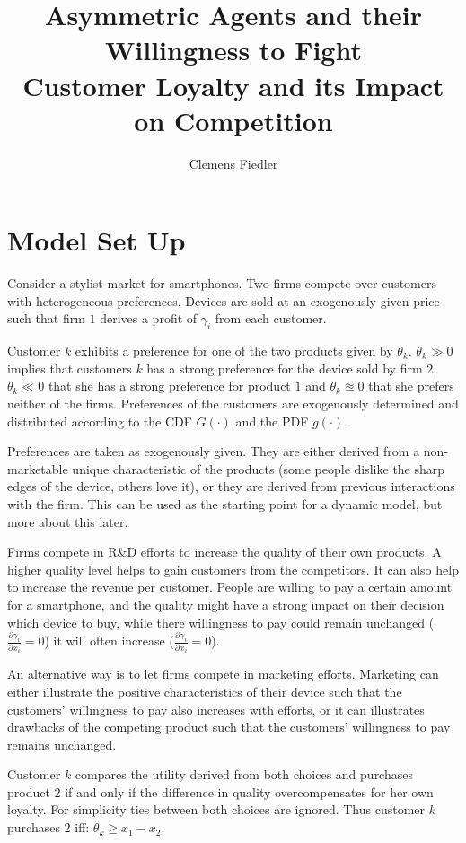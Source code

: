 \documentclass[a4paper, 11pt]{article}
\author{Clemens Fiedler}
\title{Asymmetric Agents and their Willingness to Fight\\
	Customer Loyalty and its Impact on Competition}
\begin{document}
	
\maketitle

\section{Model Set Up}
Consider a stylist market for smartphones. Two firms compete over customers with heterogeneous preferences. Devices are sold at an exogenously given price such that firm $1$ derives a profit of $\gamma_i$ from each customer.

Customer $k$ exhibits a preference for one of the two products given by $\theta_k$. $\theta_k\gg0$ implies that customers $k$ has a strong preference for the device sold by firm $2$, $\theta_k\ll0$ that she has a strong preference for product $1$ and $\theta_k\approxeq 0$ that she prefers neither of the firms. Preferences of the customers are exogenously determined and distributed according to the CDF $G(\cdot)$ and the PDF $g(\cdot)$.

Preferences are taken as exogenously given. They are either derived from a non-marketable unique characteristic of the products (some people dislike the sharp edges of the device, others love it), or they are derived from previous interactions with the firm. This can be used as the starting point for a dynamic model, but more about this later.

Firms compete in R\&D efforts to increase the quality of their own products. A higher quality level helps to gain customers from the competitors. It can also help to increase the revenue per customer. People are willing to pay a certain amount for a smartphone, and the quality might have a strong impact on their decision which device to buy, while there willingness to pay could remain unchanged ($\frac{\partial \gamma_i}{\partial x_i}=0$) it will often increase ($\frac{\partial \gamma_i}{\partial x_i}=0$).

An alternative way is to let firms compete in marketing efforts. Marketing can either illustrate the positive characteristics of their device such that the customers' willingness to pay also increases with efforts, or it can illustrates drawbacks of the competing product such that the customers' willingness to pay remains unchanged.

Customer $k$ compares the utility derived from both choices and purchases product $2$ if and only if the difference in quality overcompensates for her own loyalty. For simplicity ties between both choices are ignored. Thus customer $k$ purchases $2$ iff:
$\theta_k\geq x_1-x_2$.
\end{document}
